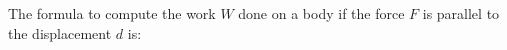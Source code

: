 The formula to compute the work $W$ done on a body if 
the force $F$ is parallel to the displacement $d$ is: